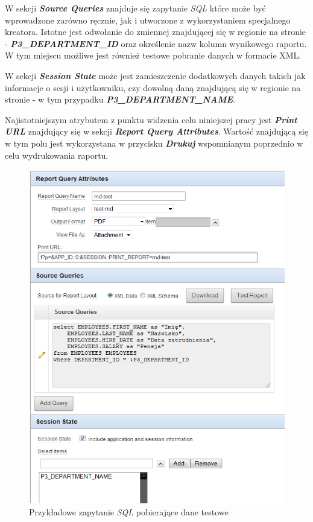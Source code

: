 \documentclass[11pt,a4paper]{article}
\begin{document}
W sekcji \textbf{\emph{Source Queries}} znajduje się zapytanie \emph{SQL} które może być wprowadzone zarówno ręcznie, jak i utworzone z wykorzystaniem specjalnego kreatora. Istotne jest odwołanie do zmiennej znajdującej się w regionie na stronie - \textbf{\emph{P3\_DEPARTMENT\_ID}} oraz określenie nazw kolumn wynikowego raportu. W tym miejscu możliwe jest również testowe pobranie danych w formacie XML.

W sekcji \textbf{\emph{Session State}} może jest zamieszczenie dodatkowych danych takich jak informacje o sesji i użytkowniku, czy dowolną daną znajdującą się w regionie na stronie - w tym przypadku \textbf{\emph{P3\_DEPARTMENT\_NAME}}. 

Najistotniejszym atrybutem z punktu widzenia celu niniejszej pracy jest \textbf{\emph{Print URL}} znajdujący się w sekcji \textbf{\emph{Report Query Attributes}}. Wartość znajdującą się w tym polu jest wykorzystana w przycisku \textbf{\emph{Drukuj}} wspomnianym poprzednio w celu wydrukowania raportu.

\begin{figure}
\centering
\includegraphics[scale=0.9]{query}
\caption{Przykładowe zapytanie \emph{SQL} pobierające dane testowe}
\label{img:query}
\end{figure}
\end{document}
